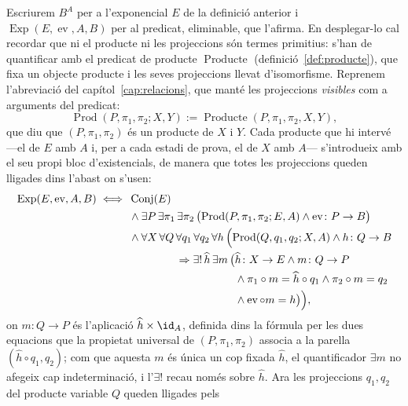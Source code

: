 \begin{notacio}\label{not:exponencial}
Escriurem \(B^A\) per a l'exponencial \(E\) de la definició anterior i
\(\operatorname{Exp}(E,\operatorname{ev},A,B)\) per al predicat,
eliminable, que l'afirma. En desplegar-lo cal recordar que ni el producte
ni les projeccions són termes primitius: s'han de quantificar amb el predicat
de producte \(\operatorname{Producte}\) (definició~\ref{def:producte}), que fixa
un objecte producte i les seves projeccions llevat d'isomorfisme. Reprenem
l'abreviació del capítol~\ref{cap:relacions}, que manté les projeccions
\emph{visibles} com a arguments del predicat:
\[
\operatorname{Prod}(P,\pi_1,\pi_2;X,Y):=\operatorname{Producte}(P,\pi_1,\pi_2,X,Y),
\]
que diu que \((P,\pi_1,\pi_2)\) és un producte de \(X\) i \(Y\). Cada producte que
hi intervé
---el de \(E\) amb \(A\) i, per a cada estadi de prova, el de \(X\) amb
\(A\)--- s'introdueix amb el seu propi bloc d'existencials, de manera que
totes les projeccions queden lligades dins l'abast on s'usen:
\[
\begin{aligned}
\operatorname{Exp}(E,\operatorname{ev},A,B)
\iff{}&
\operatorname{Conj}(E)
\\
&{}\land\exists P\,\exists\pi_1\,\exists\pi_2\,\bigl(
\operatorname{Prod}(P,\pi_1,\pi_2;E,A)\land\operatorname{ev}\colon P\to B\bigr)
\\
&{}\land\forall X\,\forall Q\,\forall q_1\,\forall q_2\,\forall h\,\Bigl(
\operatorname{Prod}(Q,q_1,q_2;X,A)\land h\colon Q\to B
\\
&\hphantom{{}\land\forall X\,\forall Q\,}
\Rightarrow
\exists!\,\widehat h\,\exists m\,\bigl(\widehat h\colon X\to E
\land m\colon Q\to P
\\
&\hphantom{{}\land\forall X\,\forall Q\,\Rightarrow\exists!\,\widehat h\,\exists m\,\bigl(}
{}\land\pi_1\circ m=\widehat h\circ q_1
\land\pi_2\circ m=q_2
\\
&\hphantom{{}\land\forall X\,\forall Q\,\Rightarrow\exists!\,\widehat h\,\exists m\,\bigl(}
{}\land\operatorname{ev}\circ m=h\bigr)\Bigr),
\end{aligned}
\]
on \(m\colon Q\to P\) és l'aplicació \(\widehat h\times\id_A\), definida
dins la fórmula per les dues equacions que la propietat universal de
\((P,\pi_1,\pi_2)\) associa a la parella \((\widehat h\circ q_1,q_2)\); com
que aquesta \(m\) és única un cop fixada \(\widehat h\), el quantificador
\(\exists m\) no afegeix cap indeterminació, i l'\(\exists!\) recau només
sobre \(\widehat h\). Ara les
projeccions \(q_1,q_2\) del producte variable \(Q\) queden lligades pels

\end{notacio}
